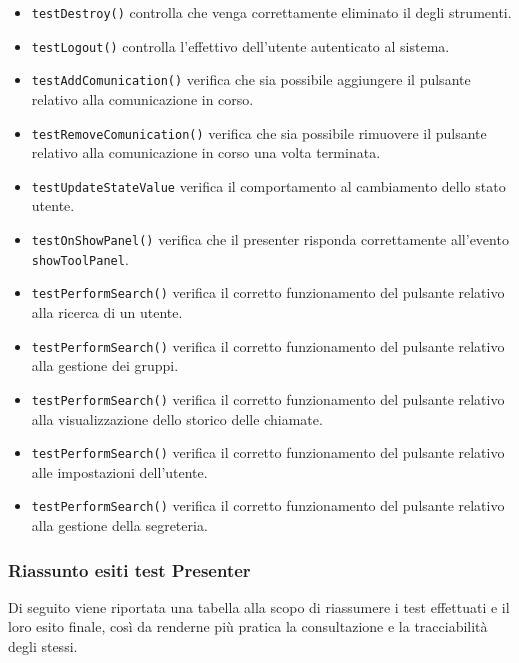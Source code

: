 \begin{itemize}
\begin{itemize}
\item \texttt{testDestroy()} controlla che venga correttamente eliminato il  degli strumenti.

\item \texttt{testLogout()} controlla l'effettivo  dell'utente autenticato al sistema.

\item \texttt{testAddComunication()} verifica che sia possibile aggiungere il pulsante
relativo alla comunicazione in corso.

\item \texttt{testRemoveComunication()} verifica che sia possibile rimuovere il pulsante relativo alla comunicazione in corso una volta terminata.

\item \texttt{testUpdateStateValue} verifica il comportamento al cambiamento dello stato utente.

\item \texttt{testOnShowPanel()} verifica che il presenter risponda correttamente all'evento\\ \texttt{showToolPanel}.

\item \texttt{testPerformSearch()} verifica il corretto funzionamento del pulsante relativo alla ricerca di un utente.

\item \texttt{testPerformSearch()} verifica il corretto funzionamento del pulsante relativo alla gestione dei gruppi.

\item \texttt{testPerformSearch()} verifica il corretto funzionamento del pulsante relativo alla visualizzazione dello storico delle chiamate.

\item \texttt{testPerformSearch()} verifica il corretto funzionamento del pulsante relativo alle impostazioni dell'utente.

\item \texttt{testPerformSearch()} verifica il corretto funzionamento del pulsante relativo alla gestione della segreteria.

\end{itemize}

\end{itemize}

\clearpage

\subsubsection{Riassunto esiti test Presenter}
Di seguito viene riportata una tabella alla scopo di riassumere i test effettuati e il loro esito finale, così da renderne più pratica la consultazione e la tracciabilità degli stessi.

